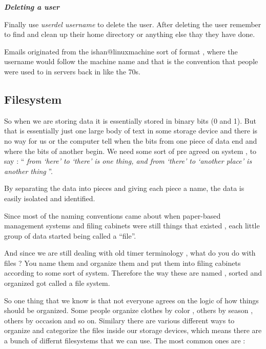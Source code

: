 \noindent
\textbf{\textit{Deleting a user}}

\noindent
Finally use \textit{userdel username} to delete the user. After deleting the
user remember to find and clean up their home directory or anything else thay
they have done.




\tcolorboxnote
{

Emails originated from the ishan@linuxmachine sort of format , where the
username would follow the machine name and that is the convention that people
were used to in servers back in like the 70s.
}


\subsectionend

\subsection{Filesystem}
\label{ssec:filesystem}

So when we are storing data it is essentially stored in binary bits (0 and 1).
But that is essentially just one large body of text in some storage device and
there is no way for us or the computer tell when the bits from one piece of data
end and where the bits of another begin. We need some sort of pre agreed on
system , to say : `` \textit{from `here' to `there' is one thing, and from
	`there' to `another place' is another thing} ''.

By separating the data into pieces and giving each piece a name, the data is
easily isolated and identified.

Since most of the naming conventions came about when paper-based management
systems and filing cabinets were still things that existed , each little group
of data started being called a ``file''. 

And since we are still dealing with old timer terminology , what do you do with
files ? You name them and organize them and put them into filing cabinets
according to some sort of system. Therefore the way these are named , sorted and
organized got called a file system.

So one thing that we know is that not everyone agrees on the logic of how things
should be organized. Some people organize clothes by color , others by season ,
others by occasion and so on. Similary there are various different ways to
organize and categorize the files inside our storage devices, which means there
are a bunch of differnt filesystems that we can use. The most common ones are :

